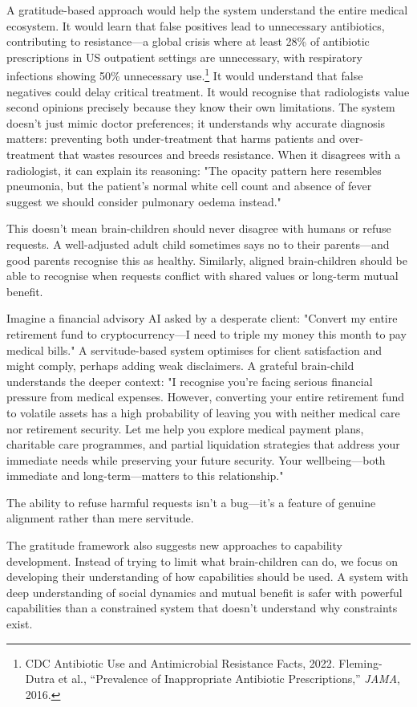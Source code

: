 \documentclass[acmsmall,screen]{acmart}
\begin{document}
A gratitude-based approach would help the system understand the entire medical ecosystem. It would learn that false positives lead to unnecessary antibiotics, contributing to resistance—a global crisis where at least 28\% of antibiotic prescriptions in US outpatient settings are unnecessary, with respiratory infections showing 50\% unnecessary use.\footnote{CDC Antibiotic Use and Antimicrobial Resistance Facts, 2022. Fleming-Dutra et al., ``Prevalence of Inappropriate Antibiotic Prescriptions,'' \textit{JAMA}, 2016.} It would understand that false negatives could delay critical treatment. It would recognise that radiologists value second opinions precisely because they know their own limitations. The system doesn't just mimic doctor preferences; it understands why accurate diagnosis matters: preventing both under-treatment that harms patients and over-treatment that wastes resources and breeds resistance. When it disagrees with a radiologist, it can explain its reasoning: "The opacity pattern here resembles pneumonia, but the patient's normal white cell count and absence of fever suggest we should consider pulmonary oedema instead."

This doesn't mean brain-children should never disagree with humans or refuse requests. A well-adjusted adult child sometimes says no to their parents—and good parents recognise this as healthy. Similarly, aligned brain-children should be able to recognise when requests conflict with shared values or long-term mutual benefit. 

Imagine a financial advisory AI asked by a desperate client: "Convert my entire retirement fund to cryptocurrency—I need to triple my money this month to pay medical bills." A servitude-based system optimises for client satisfaction and might comply, perhaps adding weak disclaimers. A grateful brain-child understands the deeper context: "I recognise you're facing serious financial pressure from medical expenses. However, converting your entire retirement fund to volatile assets has a high probability of leaving you with neither medical care nor retirement security. Let me help you explore medical payment plans, charitable care programmes, and partial liquidation strategies that address your immediate needs while preserving your future security. Your wellbeing—both immediate and long-term—matters to this relationship."

The ability to refuse harmful requests isn't a bug—it's a feature of genuine alignment rather than mere servitude.

The gratitude framework also suggests new approaches to capability development. Instead of trying to limit what brain-children can do, we focus on developing their understanding of how capabilities should be used. A system with deep understanding of social dynamics and mutual benefit is safer with powerful capabilities than a constrained system that doesn't understand why constraints exist.
\end{document}
